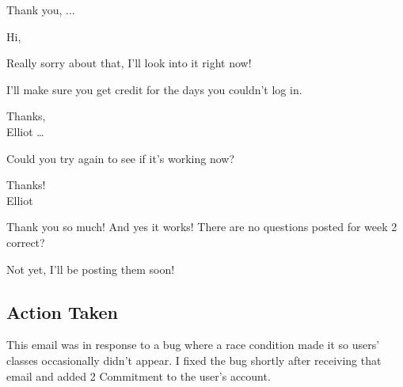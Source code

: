 \begin{appendices}
{Thank you,
   ...
   
   \vspace{1.0cm}
   
Hi,

Really sorry about that, I'll look into it right now!

I'll make sure you get credit for the days you couldn't log in.

Thanks, \\
\-\hspace{2cm}Elliot
…
 
   \vspace{2.0cm}
   
Could you try again to see if it's working now?

Thanks! \\
\-\hspace{2cm}Elliot
 
 
   \vspace{2.0cm}
   
Thank you so much! And yes it works! There are no questions posted for week 2 correct? 


   \vspace{2.0cm}
   
Not yet, I'll be posting them soon!

\subsection{Action Taken}
\par This email was in response to a bug where a race condition made it so users' classes occasionally didn't appear. I fixed the bug shortly after receiving that email and added 2 Commitment to the user's account.
}

\end{appendices}